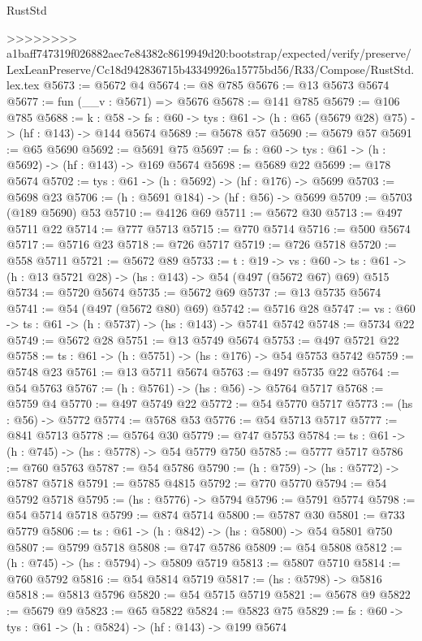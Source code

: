 \begin{lexlean}{RustStd}
\begin{coremodule}
{\begin{coremodule}
{{{{{{{{{{{{>>>>>>>> a1baff747319f026882aec7e84382c8619949d20:bootstrap/expected/verify/preserve/LexLeanPreserve/Cc18d942836715b43349926a15775bd56/R33/Compose/RustStd.lex.tex
@5673 := @5672 @4
@5674 := @8 @785
@5676 := @13 @5673 @5674
@5677 := fun (__v : @5671) => @5676
@5678 := @141 @785
@5679 := @106 @785
@5688 := {k : @58} ->
  {fs : @60} -> {tys : @61} -> (h : @65 (@5679 @28) @75) -> (hf : @143) -> @144 @5674
@5689 := @5678 @57
@5690 := @5679 @57
@5691 := @65 @5690
@5692 := @5691 @75
@5697 := {fs : @60} -> {tys : @61} -> (h : @5692) -> (hf : @143) -> @169 @5674
@5698 := @5689 @22
@5699 := @178 @5674
@5702 := {tys : @61} -> (h : @5692) -> (hf : @176) -> @5699
@5703 := @5698 @23
@5706 := (h : @5691 @184) -> (hf : @56) -> @5699
@5709 := @5703 (@189 @5690) @53
@5710 := @4126 @69
@5711 := @5672 @30
@5713 := @497 @5711 @22
@5714 := @777 @5713
@5715 := @770 @5714
@5716 := @500 @5674
@5717 := @5716 @23
@5718 := @726 @5717
@5719 := @726 @5718
@5720 := @558 @5711
@5721 := @5672 @89
@5733 := {t : @19} ->
  {vs : @60} -> {ts : @61} -> (h : @13 @5721 @28) -> (hs : @143) -> @54 (@497 (@5672 @67) @69) @515
@5734 := @5720 @5674
@5735 := @5672 @69
@5737 := @13 @5735 @5674
@5741 := @54 (@497 (@5672 @80) @69)
@5742 := @5716 @28
@5747 := {vs : @60} -> {ts : @61} -> (h : @5737) -> (hs : @143) -> @5741 @5742
@5748 := @5734 @22
@5749 := @5672 @28
@5751 := @13 @5749 @5674
@5753 := @497 @5721 @22
@5758 := {ts : @61} -> (h : @5751) -> (hs : @176) -> @54 @5753 @5742
@5759 := @5748 @23
@5761 := @13 @5711 @5674
@5763 := @497 @5735 @22
@5764 := @54 @5763
@5767 := (h : @5761) -> (hs : @56) -> @5764 @5717
@5768 := @5759 @4
@5770 := @497 @5749 @22
@5772 := @54 @5770 @5717
@5773 := (hs : @56) -> @5772
@5774 := @5768 @53
@5776 := @54 @5713 @5717
@5777 := @841 @5713
@5778 := @5764 @30
@5779 := @747 @5753
@5784 := {ts : @61} -> (h : @745) -> (hs : @5778) -> @54 @5779 @750
@5785 := @5777 @5717
@5786 := @760 @5763
@5787 := @54 @5786
@5790 := (h : @759) -> (hs : @5772) -> @5787 @5718
@5791 := @5785 @4815
@5792 := @770 @5770
@5794 := @54 @5792 @5718
@5795 := (hs : @5776) -> @5794
@5796 := @5791 @5774
@5798 := @54 @5714 @5718
@5799 := @874 @5714
@5800 := @5787 @30
@5801 := @733 @5779
@5806 := {ts : @61} -> (h : @842) -> (hs : @5800) -> @54 @5801 @750
@5807 := @5799 @5718
@5808 := @747 @5786
@5809 := @54 @5808
@5812 := (h : @745) -> (hs : @5794) -> @5809 @5719
@5813 := @5807 @5710
@5814 := @760 @5792
@5816 := @54 @5814 @5719
@5817 := (hs : @5798) -> @5816
@5818 := @5813 @5796
@5820 := @54 @5715 @5719
@5821 := @5678 @9
@5822 := @5679 @9
@5823 := @65 @5822
@5824 := @5823 @75
@5829 := {fs : @60} -> {tys : @61} -> (h : @5824) -> (hf : @143) -> @199 @5674
}}}}}}}}}}}}
\end{coremodule}}
\end{coremodule}
\end{lexlean}
